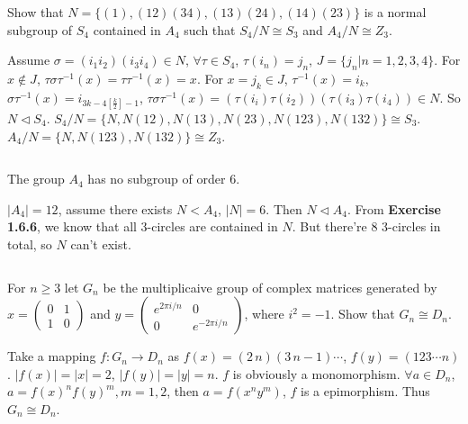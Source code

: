 $$ $$

\begin{ex}
    Show that $N=\{(1),(12)(34),(13)(24),(14)(23)\}$ is a normal subgroup of $S_{4}$ contained in $A_{4}$ such that $S_{4} /N\cong S_{3}$ and $A_{4} /N\cong Z_{3}$.
\end{ex}

\begin{answer}
    Assume $\sigma=(i_{1}i_{2})(i_{3}i_{4})\in N$, $\forall \tau\in S_{4}$, $\tau(i_{n})=j_{n}$, $J=\{j_{n}|n=1,2,3,4\}$. For $x\notin J$, $\tau\sigma\tau^{-1}(x)=\tau\tau^{-1}(x)=x$. For $x=j_{k}\in J$, $\tau^{-1}(x)=i_{k}$, $\sigma\tau^{-1}(x)=i_{3k-4\left[\frac{k}{2}\right]-1}$, $\tau\sigma\tau^{-1}(x)=(\tau(i_{i})\tau(i_{2}))(\tau(i_{3})\tau(i_{4}))\in N$. So $N\lhd S_{4}$. $S_{4} /N=\{N, N(12), N(13), N(23), N(123), N(132)\}\cong S_{3}$. $A_{4} /N=\{N, N(123), N(132)\}\cong Z_{3}$.
\end{answer}

$$ $$

\begin{ex}
    The group $A_{4}$ has no subgroup of order $6$.
\end{ex}

\begin{answer}
    $\left| A_{4} \right| =12$, assume there exists $N<A_{4}$, $\left| N \right| =6$. Then $N\lhd A_{4}$. From \textbf{Exercise 1.6.6}, we know that all 3-circles are contained in $N$. But there're 8 3-circles in total, so $N$ can't exist.
\end{answer}

$$ $$

\begin{ex}
    For $n\geq 3$ let $G_{n}$ be the multiplicaive group of complex matrices generated by $x=\begin{pmatrix}
        0&1\\1&0
    \end{pmatrix}$ and $y=\begin{pmatrix}
        e^{2\pi i/n}&0\\0&e^{-2\pi i/n}
    \end{pmatrix}$, where $i^{2}=-1$. Show that $G_{n}\cong D_{n}$.
\end{ex}

\begin{answer}
    Take a mapping $f:G_{n}\to D_{n}$ as $f(x)=(2\,n)(3\,n-1)\cdots$, $f(y)=(123\cdots n)$. $\left| f(x) \right|=\left| x \right| =2$, $\left| f(y) \right| =\left| y \right| =n$. $f$ is obviously a monomorphism. $\forall a\in D_{n}$, $a=f(x)^{n}f(y)^{m}, m=1,2$, then $a=f(x^{n}y^{m})$, $f$ is a epimorphism. Thus $G_{n}\cong D_{n}$. 
\end{answer}

